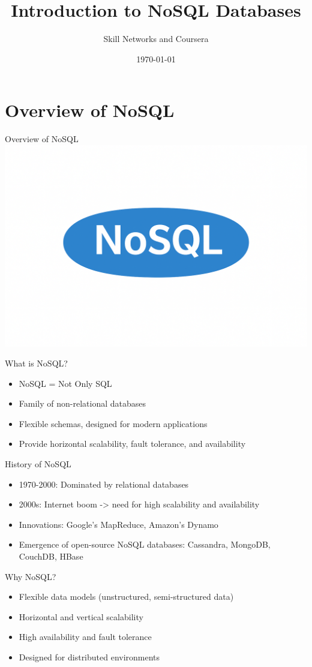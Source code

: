 \documentclass{beamer}
\title{Introduction to NoSQL Databases}
\author{Skill Networks and Coursera}
\date{\today}
\begin{document}
\frame{\titlepage}

\section{Overview of NoSQL}

\begin{frame}{\centering Overview of NoSQL}
\centering
\includegraphics[width=0.7\linewidth]{figures/nosql}
\end{frame}

\begin{frame}{What is NoSQL?}
\begin{itemize}
    \item NoSQL = Not Only SQL
    \item Family of non-relational databases
    \item Flexible schemas, designed for modern applications
    \item Provide horizontal scalability, fault tolerance, and availability
\end{itemize}
\end{frame}

\begin{frame}{History of NoSQL}
\begin{itemize}
    \item 1970-2000: Dominated by relational databases
    \item 2000s: Internet boom -> need for high scalability and availability
    \item Innovations: Google's MapReduce, Amazon's Dynamo
    \item Emergence of open-source NoSQL databases: Cassandra, MongoDB, CouchDB, HBase
\end{itemize}
\end{frame}

\begin{frame}{Why NoSQL?}
\begin{itemize}
    \item Flexible data models (unstructured, semi-structured data)
    \item Horizontal and vertical scalability
    \item High availability and fault tolerance
    \item Designed for distributed environments
\end{itemize}
\end{frame}
\end{document}
